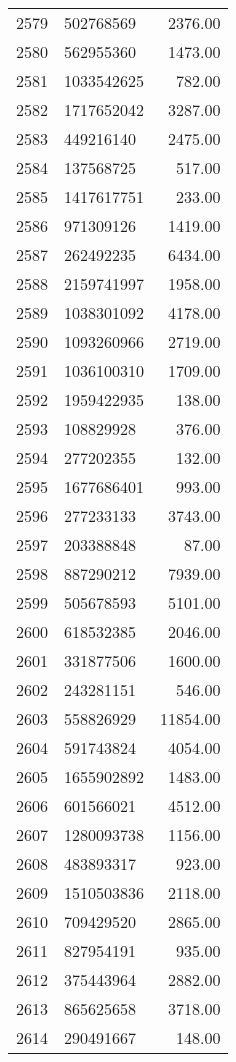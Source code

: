 \begin{table}[ht]
\begin{tabular}{rlr}
  2579 & 502768569 & 2376.00 \\ 
  2580 & 562955360 & 1473.00 \\ 
  2581 & 1033542625 & 782.00 \\ 
  2582 & 1717652042 & 3287.00 \\ 
  2583 & 449216140 & 2475.00 \\ 
  2584 & 137568725 & 517.00 \\ 
  2585 & 1417617751 & 233.00 \\ 
  2586 & 971309126 & 1419.00 \\ 
  2587 & 262492235 & 6434.00 \\ 
  2588 & 2159741997 & 1958.00 \\ 
  2589 & 1038301092 & 4178.00 \\ 
  2590 & 1093260966 & 2719.00 \\ 
  2591 & 1036100310 & 1709.00 \\ 
  2592 & 1959422935 & 138.00 \\ 
  2593 & 108829928 & 376.00 \\ 
  2594 & 277202355 & 132.00 \\ 
  2595 & 1677686401 & 993.00 \\ 
  2596 & 277233133 & 3743.00 \\ 
  2597 & 203388848 & 87.00 \\ 
  2598 & 887290212 & 7939.00 \\ 
  2599 & 505678593 & 5101.00 \\ 
  2600 & 618532385 & 2046.00 \\ 
  2601 & 331877506 & 1600.00 \\ 
  2602 & 243281151 & 546.00 \\ 
  2603 & 558826929 & 11854.00 \\ 
  2604 & 591743824 & 4054.00 \\ 
  2605 & 1655902892 & 1483.00 \\ 
  2606 & 601566021 & 4512.00 \\ 
  2607 & 1280093738 & 1156.00 \\ 
  2608 & 483893317 & 923.00 \\ 
  2609 & 1510503836 & 2118.00 \\ 
  2610 & 709429520 & 2865.00 \\ 
  2611 & 827954191 & 935.00 \\ 
  2612 & 375443964 & 2882.00 \\ 
  2613 & 865625658 & 3718.00 \\ 
  2614 & 290491667 & 148.00 \\ 

\end{tabular}
\end{table}
